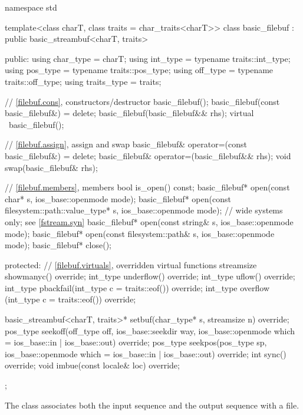 %
\begin{codeblock}
namespace std {
  template<class charT, class traits = char_traits<charT>>
  class basic_filebuf : public basic_streambuf<charT, traits> {
  public:
    using char_type   = charT;
    using int_type    = typename traits::int_type;
    using pos_type    = typename traits::pos_type;
    using off_type    = typename traits::off_type;
    using traits_type = traits;

    // \ref{filebuf.cons}, constructors/destructor
    basic_filebuf();
    basic_filebuf(const basic_filebuf&) = delete;
    basic_filebuf(basic_filebuf&& rhs);
    virtual ~basic_filebuf();

    // \ref{filebuf.assign}, assign and swap
    basic_filebuf& operator=(const basic_filebuf&) = delete;
    basic_filebuf& operator=(basic_filebuf&& rhs);
    void swap(basic_filebuf& rhs);

    // \ref{filebuf.members}, members
    bool is_open() const;
    basic_filebuf* open(const char* s, ios_base::openmode mode);
    basic_filebuf* open(const filesystem::path::value_type* s,
                        ios_base::openmode mode);   // wide systems only; see \ref{fstream.syn}
    basic_filebuf* open(const string& s,
                        ios_base::openmode mode);
    basic_filebuf* open(const filesystem::path& s,
                        ios_base::openmode mode);
    basic_filebuf* close();

  protected:
    // \ref{filebuf.virtuals}, overridden virtual functions
    streamsize showmanyc() override;
    int_type underflow() override;
    int_type uflow() override;
    int_type pbackfail(int_type c = traits::eof()) override;
    int_type overflow (int_type c = traits::eof()) override;

    basic_streambuf<charT, traits>* setbuf(char_type* s,
                                           streamsize n) override;
    pos_type seekoff(off_type off, ios_base::seekdir way,
                     ios_base::openmode which
                      = ios_base::in | ios_base::out) override;
    pos_type seekpos(pos_type sp,
                     ios_base::openmode which
                      = ios_base::in | ios_base::out) override;
    int      sync() override;
    void     imbue(const locale& loc) override;
  };
}
\end{codeblock}

\pnum
The class
associates both the input sequence and the output
sequence with a file.

